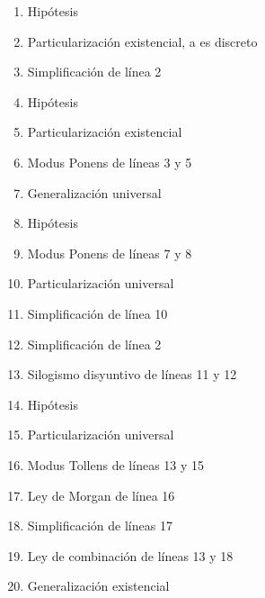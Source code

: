 \documentclass[letterpaper,10pt]{article}
\begin{document}
    \begin{minipage}[c]{0.5\textwidth}
        \vspace{2.15cm}
        \begin{enumerate}
           \vspace{-0.06cm}\item Hip\'otesis
           \vspace{-0.06cm}\item Particularizaci\'on existencial, a es discreto
           \vspace{-0.06cm}\item Simplificaci\'on de l\'inea 2
           \vspace{-0.06cm}\item Hip\'otesis
           \vspace{-0.06cm}\item Particularizaci\'on existencial
           \vspace{-0.06cm}\item Modus Ponens de l\'ineas 3 y 5
           \vspace{-0.06cm}\item Generalizaci\'on universal
           \vspace{-0.06cm}\item Hip\'otesis
           \vspace{-0.06cm}\item Modus Ponens de l\'ineas 7 y 8
           \vspace{-0.06cm}\item Particularizaci\'on universal
           \vspace{-0.06cm}\item Simplificaci\'on de l\'inea 10
           \vspace{-0.06cm}\item Simplificaci\'on de l\'inea 2
           \vspace{-0.06cm}\item Silogismo disyuntivo de l\'ineas 11 y 12
           \vspace{-0.06cm}\item Hip\'otesis
           \vspace{-0.06cm}\item Particularizaci\'on universal
           \vspace{-0.06cm}\item Modus Tollens de l\'ineas 13 y 15
           \vspace{-0.06cm}\item Ley de Morgan de l\'inea 16
           \vspace{-0.06cm}\item Simplificaci\'on de l\'ineas 17
           \vspace{-0.06cm}\item Ley de combinaci\'on de l\'ineas 13 y 18
           \vspace{-0.06cm}\item Generalizaci\'on existencial
        \end{enumerate}
        \end{minipage}
    
\end{document}
